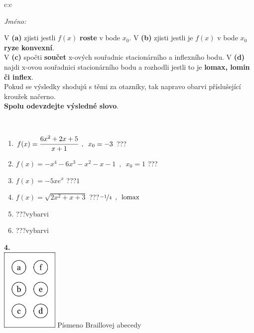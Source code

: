 \documentclass[10pt]{report}
\begin{document}
\begin{tabular}{c:c}
\begin{minipage}[c][104.5mm][t]{0.5\linewidth}
\begin{center}
\textit{Jméno:}\phantom{xxxxxxxxxxxxxxxxxxxxxxxxxxxxxxxxxxxxxxxxxxxxxxxxxxxxxxxxxxxxxxxxx}\\[5mm]
\begin{minipage}{0.95\linewidth}
\begin{center}
{\small V \textbf{(a)} zjisti jestli $f(x)$ \textbf{roste} v bode $x_0$. V \textbf{(b)} zjisti jestli je $f(x)$ v bode $x_0$ \textbf{ryze konvexní}.\\V \textbf{(c)} spočti \textbf{součet} x-ových souřadnic stacionárního a inflexního bodu. V \textbf{(d)} najdi x-ovou souřadnici stacionárního bodu a rozhodli jestli to je \textbf{lomax, lomin či inflex}.\\Pokud se výsledky shodujú s těmi za otazníky, tak napravo obarvi příslušející kroužek načerno.\\\textbf{Spolu odevzdejte výsledné slovo}}.
\end{center}
\end{minipage}
\\[1mm]
\begin{minipage}{0.79\linewidth}
\begin{center}
\begin{varwidth}{\linewidth}
\begin{enumerate}
\normalsize
\item $f(x)=\cfrac{6x^2+2x+5}{x+1}\enspace , \enspace x_0=-3$\quad \dotfill\; ???\;\dotfill \quad {}
\item $f(x)=-x^4-6x^3-x^2-x-1\enspace , \enspace x_0=1$\quad \dotfill\; ???\;\dotfill \quad {}
\item $f(x)=-5xe^{x}$\quad \dotfill\; ???\;\dotfill \quad $1$
\item $f(x)=\sqrt{2x^2+x+3}$\quad \dotfill\; ???\;\dotfill \quad $\nicefrac{-1}{4}\enspace , \enspace\mathrm{lomax}$
\item \quad \dotfill\; ???\;\dotfill \quad vybarvi
\item \quad \dotfill\; ???\;\dotfill \quad vybarvi
\end{enumerate}
\end{varwidth}
\end{center}
\end{minipage}
\begin{minipage}{0.20\linewidth}
\begin{center}
{\Huge\bfseries 4.} \\[2mm]
\includegraphics[height=40mm]{../images/braille.png}
{\small Písmeno Braillovej abecedy}
\end{center}
\end{minipage}
\end{center}
\end{minipage}
%
\end{tabular}
\end{document}
